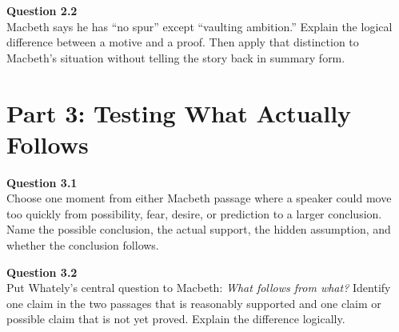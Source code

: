 \documentclass[12pt]{article}
\begin{document}

\textbf{Question 2.2}\\[-0.15em]
Macbeth says he has ``no spur'' except ``vaulting ambition.'' Explain the logical difference between a motive and a proof. Then apply that distinction to Macbeth's situation without telling the story back in summary form.


\newpage

\section*{Part 3: Testing What Actually Follows}

\textbf{Question 3.1}\\[-0.15em]
Choose one moment from either Macbeth passage where a speaker could move too quickly from possibility, fear, desire, or prediction to a larger conclusion. Name the possible conclusion, the actual support, the hidden assumption, and whether the conclusion follows.


\textbf{Question 3.2}\\[-0.15em]
Put Whately's central question to Macbeth: \textit{What follows from what?} Identify one claim in the two passages that is reasonably supported and one claim or possible claim that is not yet proved. Explain the difference logically.

\end{document}
